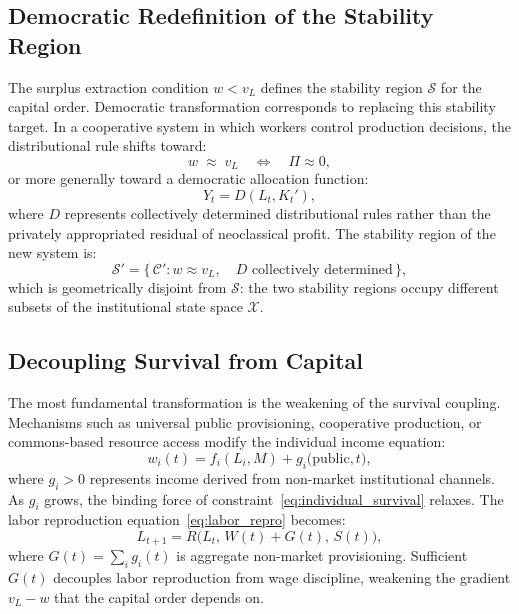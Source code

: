 \documentclass[12pt,a4paper]{article}
\theoremstyle{definition}
\theoremstyle{remark}
\begin{document}
\subsection{Democratic Redefinition of the Stability Region}

The surplus extraction condition $w < v_L$ defines the stability region $\mathcal{S}$ for the capital order. Democratic transformation corresponds to replacing this stability target. In a cooperative system in which workers control production decisions, the distributional rule shifts toward:
\begin{equation}
  w \;\approx\; v_L \quad\Longleftrightarrow\quad \Pi \approx 0,
\end{equation}
or more generally toward a democratic allocation function:
\begin{equation}
  Y_t = D(L_t, K_t'),
\end{equation}
where $D$ represents collectively determined distributional rules rather than the privately appropriated residual of neoclassical profit. The stability region of the new system is:
\begin{equation}
  \mathcal{S}' = \bigl\{\,\mathcal{C}' : w \approx v_L,\quad D\text{ collectively determined}\,\bigr\},
\end{equation}
which is geometrically disjoint from $\mathcal{S}$: the two stability regions occupy different subsets of the institutional state space $\mathcal{X}$.

\subsection{Decoupling Survival from Capital}

The most fundamental transformation is the weakening of the survival coupling. Mechanisms such as universal public provisioning, cooperative production, or commons-based resource access modify the individual income equation:
\begin{equation}
  w_i(t) = f_i(L_i, M) + g_i\!\bigl(\text{public}, t\bigr),
\end{equation}
where $g_i > 0$ represents income derived from non-market institutional channels. As $g_i$ grows, the binding force of constraint~\eqref{eq:individual_survival} relaxes. The labor reproduction equation~\eqref{eq:labor_repro} becomes:
\begin{equation}
  L_{t+1} = R\!\bigl(L_t,\, W(t) + G(t),\, S(t)\bigr),
\end{equation}
where $G(t) = \sum_i g_i(t)$ is aggregate non-market provisioning. Sufficient $G(t)$ decouples labor reproduction from wage discipline, weakening the gradient $v_L - w$ that the capital order depends on.
\end{document}

